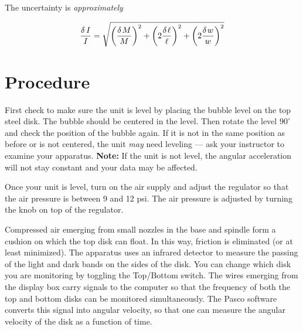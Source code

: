 The uncertainty is {\em approximately}

\begin{equation}
{{\delta \,I} \over I}=\sqrt {\left( {{{\delta \kern 1pt M} \over M}} \right)^2+\left( {2{{\delta \kern 1pt \ell } \over \ell }} \right)^2+\left( {2{{\delta \kern 1pt w} \over w}} \right)^2}
\end{equation}


\section*{Procedure}


First check to make sure the unit is level by placing the bubble level
on the top steel disk.  The bubble should be centered in the level.
Then rotate the level $90^{\circ}$ and check the position of the
bubble again.  If it is not in the same position as before or is not
centered, the unit {\em may} need leveling --- ask your instructor to
examine your apparatus.  {\bf Note:} If the unit is not level, the
angular acceleration will not stay constant and your data may be
affected.

Once your unit is level, turn on the
air supply and adjust the regulator so that the air pressure is between 9 and 12 psi.
The air pressure is adjusted by turning the knob on top of the regulator.

Compressed air emerging from small nozzles in the base and
spindle form a cushion on which the top disk can float.  In
this way, friction is eliminated (or at least minimized).
The apparatus
uses an infrared detector to measure the passing of the light and dark bands on the
sides of the disk.  
You can change which disk you are monitoring by toggling the
Top/Bottom switch.  
The wires emerging from the display box carry signals to
the computer so that the frequency of both the top and bottom disks can be
monitored simultaneously.  The Pasco software converts this signal
into angular velocity, so that one can measure the angular velocity of
the disk as a function of time.

